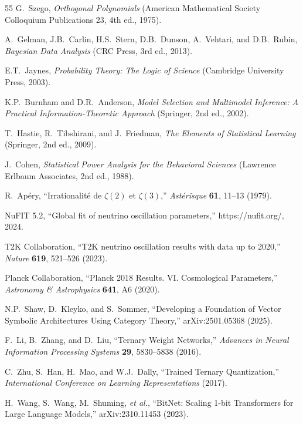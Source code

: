 \documentclass[aps,prd,preprint,superscriptaddress,showpacs,nofootinbib,longbibliography]{revtex4-2}
\begin{document}
\begin{thebibliography}{55}
G.~Szego,
\textit{Orthogonal Polynomials} (American Mathematical Society Colloquium Publications 23, 4th ed., 1975).

A.~Gelman, J.B.~Carlin, H.S.~Stern, D.B.~Dunson, A.~Vehtari, and D.B.~Rubin,
\textit{Bayesian Data Analysis} (CRC Press, 3rd ed., 2013).

E.T.~Jaynes,
\textit{Probability Theory: The Logic of Science} (Cambridge University Press, 2003).

K.P.~Burnham and D.R.~Anderson,
\textit{Model Selection and Multimodel Inference: A Practical Information-Theoretic Approach} (Springer, 2nd ed., 2002).

T.~Hastie, R.~Tibshirani, and J.~Friedman,
\textit{The Elements of Statistical Learning} (Springer, 2nd ed., 2009).

J.~Cohen,
\textit{Statistical Power Analysis for the Behavioral Sciences} (Lawrence Erlbaum Associates, 2nd ed., 1988).

R.~Ap\'ery,
``Irrationalit\'e de $\zeta(2)$ et $\zeta(3)$,''
\textit{Ast\'erisque} \textbf{61}, 11--13 (1979).

NuFIT 5.2,
``Global fit of neutrino oscillation parameters,''
https://nufit.org/, 2024.

T2K Collaboration,
``T2K neutrino oscillation results with data up to 2020,''
\textit{Nature} \textbf{619}, 521--526 (2023).

Planck Collaboration,
``Planck 2018 Results. VI. Cosmological Parameters,''
\textit{Astronomy \& Astrophysics} \textbf{641}, A6 (2020).

N.P.~Shaw, D.~Kleyko, and S.~Sommer,
``Developing a Foundation of Vector Symbolic Architectures Using Category Theory,''
arXiv:2501.05368 (2025).

F.~Li, B.~Zhang, and D.~Liu,
``Ternary Weight Networks,''
\textit{Advances in Neural Information Processing Systems} \textbf{29}, 5830--5838 (2016).

C.~Zhu, S.~Han, H.~Mao, and W.J.~Dally,
``Trained Ternary Quantization,''
\textit{International Conference on Learning Representations} (2017).

H.~Wang, S.~Wang, M.~Shuming, \textit{et al.},
``BitNet: Scaling 1-bit Transformers for Large Language Models,''
arXiv:2310.11453 (2023).


\end{thebibliography}
\end{document}
